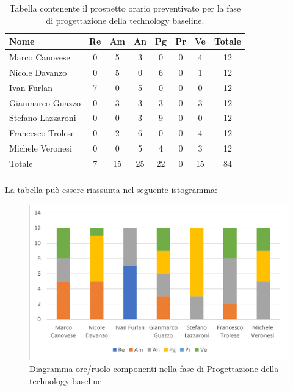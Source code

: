 \begin{longtable}{|l|c|c|c|c|c|c|c|}
	\hline
	\rowcolor{lighter-grayer}
	\textbf{Nome}     & \textbf{Re} & \textbf{Am} & \textbf{An} & \textbf{Pg} & \textbf{Pr} & \textbf{Ve} & \textbf{Totale} \\
	\hline
	\endfirsthead

	\hline
	Marco Canovese    & 0           & 5           & 3           & 0           & 0           & 4           & 12              \\
	\hline
	\hline
	Nicole Davanzo    & 0           & 5           & 0           & 6           & 0           & 1           & 12              \\
	\hline
	\hline
	Ivan Furlan       & 7           & 0           & 5           & 0           & 0           & 0           & 12              \\
	\hline
	\hline
	Gianmarco Guazzo  & 0           & 3           & 3           & 3           & 0           & 3           & 12              \\
	\hline
	\hline
	Stefano Lazzaroni & 0           & 0           & 3           & 9           & 0           & 0           & 12              \\
	\hline
	\hline
	Francesco Trolese & 0           & 2           & 6           & 0           & 0           & 4           & 12              \\
	\hline
	\hline
	Michele Veronesi  & 0           & 0           & 5           & 4           & 0           & 3           & 12              \\
	\hline
	\hline
	Totale            & 7           & 15          & 25          & 22          & 0           & 15          & 84              \\
	\hline
	\rowcolor{white}
	\caption{Tabella contenente il prospetto orario preventivato per la fase di progettazione della technology baseline.}
\end{longtable}


La tabella può essere riassunta nel seguente istogramma:

\begin{figure}[H]
	\centering
	\includegraphics[width=0.8\linewidth]{res/images/preventivo/3-1.png}
	\caption{Diagramma ore/ruolo componenti nella fase di Progettazione della technology baseline }
	\label{fig:diagramma suddivisione ruoli fase progettazione della technology baseline}
\end{figure}


